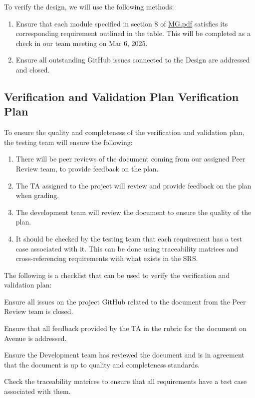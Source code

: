 \documentclass[12pt, titlepage]{article}
\begin{document}



To verify the design, we will use the following methods:
\begin{enumerate}
\item Ensure that each module specified in section 8 of \href{https://github.com/Spitgranger/SyncMaster/blob/main/docs/Design/SoftArchitecture/MG.pdf}{MG.pdf}
satisfies its corresponding requirement outlined in the table. This will be completed as a check in our team meeting on Mar 6, 2025.
\item Ensure all outstanding GitHub issues connected to the Design are addressed and closed.
\end{enumerate}

\subsection{Verification and Validation Plan Verification Plan}

To ensure the quality and completeness of the verification and
validation plan, the testing team will ensure the following:

\begin{enumerate}
  \item There will be peer reviews of the document coming from our
    assigned Peer Review team, to provide feedback on the plan.
  \item The TA assigned to the project will review and provide
    feedback on the plan when grading.
  \item The development team will review the document to ensure the
    quality of the plan.
  \item It should be checked by the testing team that each
    requirement has a test case associated with it. This can be done
    using traceability matrices and cross-referencing requirements
    with what exists in the SRS.
\end{enumerate}

The following is a checklist that can be used to verify the
verification and validation plan:
\begin{todolist}
\item Ensure all issues on the project GitHub related to the document
  from the Peer Review team is closed.
\item Ensure that all feedback provided by the TA in the rubric for
  the document on Avenue is addressed.
\item Ensure the Development team has reviewed the document and is in
  agreement that the document is up to quality and completeness standards.
\item Check the traceability matrices to ensure that all requirements
  have a test case associated with them.
\end{todolist}
\end{document}
